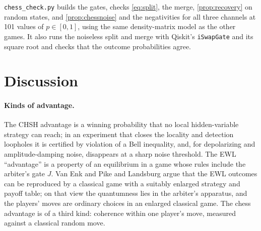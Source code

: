 \documentclass[11pt,a4paper]{article}
\begin{document}
\texttt{chess\_check.py} builds the gates, checks \cref{eq:split}, the merge, \cref{prop:recovery} on random states, and \cref{prop:chessnoise} and the negativities for all three channels at 101 values of $p\in[0,1]$, using the same density-matrix model as the other games. It also runs the noiseless split and merge with Qiskit's \texttt{iSwapGate} and its square root and checks that the outcome probabilities agree.

\FloatBarrier
\section{Discussion}

\paragraph{Kinds of advantage.} The CHSH advantage is a winning probability that no local hidden-variable strategy can reach; in an experiment that closes the locality and detection loopholes it is certified by violation of a Bell inequality, and, for depolarizing and amplitude-damping noise, disappears at a sharp noise threshold. The EWL ``advantage'' is a property of an equilibrium in a game whose rules include the arbiter's gate $J$. Van Enk and Pike \cite{vanenk} and Landsburg \cite{landsburg} argue that the EWL outcomes can be reproduced by a classical game with a suitably enlarged strategy and payoff table; on that view the quantumness lies in the arbiter's apparatus, and the players' moves are ordinary choices in an enlarged classical game. The chess advantage is of a third kind: coherence within one player's move, measured against a classical random move.
\end{document}
